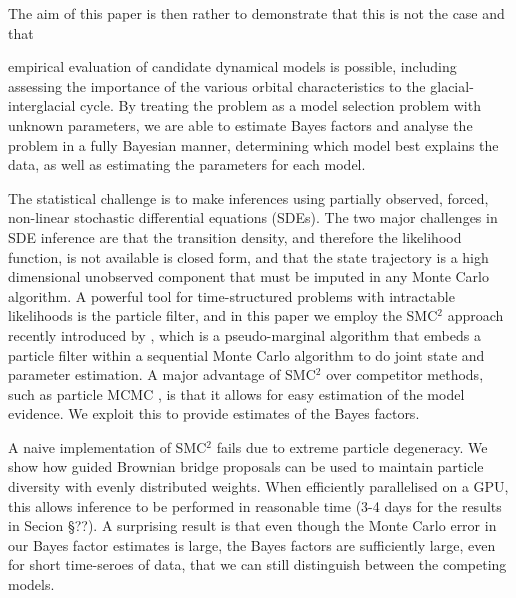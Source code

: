 \documentclass[a4paper,12pt]{article}
\newcommand{\mcr}[1]{\par\medskip\noindent\fbox{\parbox{\textwidth}{\textbf{Comment by MC}: #1 }}\medskip}
\begin{document}
The aim of this paper is then rather to demonstrate that this is not the case and that \mcr{aren't we a bit strong here ?}  empirical evaluation of  candidate dynamical models is possible, including assessing the importance of the various orbital characteristics to the glacial-interglacial cycle.
By treating the problem as a model selection problem with unknown parameters, we are able to estimate Bayes factors and analyse the problem in a fully Bayesian manner,  determining which model best explains the  data, as well as estimating the  parameters for each model.

The statistical challenge
 is to make 
inferences using partially observed, forced,
non-linear stochastic differential equations (SDEs). The two major challenges in SDE inference are  that the transition density, and therefore the likelihood function, is not
available is closed form, and that the state trajectory is a high dimensional unobserved component that must be imputed in any Monte Carlo algorithm.
 A powerful tool for time-structured problems with intractable likelihoods is the particle
filter, and in this paper we employ the  SMC$^2$ approach recently
introduced by \cite{Chopin2012}, which is a pseudo-marginal algorithm that embeds a particle filter within a sequential Monte Carlo algorithm to do joint state and parameter estimation. A major advantage of SMC$^2$ over  competitor methods, such as particle MCMC \cite{Andrieu2010}, is that it allows for easy estimation of the model evidence. We exploit this to provide estimates of the Bayes factors. 

A naive implementation of SMC$^2$ fails due to extreme particle degeneracy. We show how guided Brownian bridge proposals can be used to maintain particle diversity with evenly distributed weights. When efficiently parallelised on a GPU, this allows inference to be performed in reasonable time (3-4 days for the results in Secion \S??). A surprising result is that even though the Monte Carlo error in our Bayes factor estimates is large, the Bayes factors are sufficiently large, even for short time-seroes of data, that we can still distinguish between the competing models.
\end{document}
